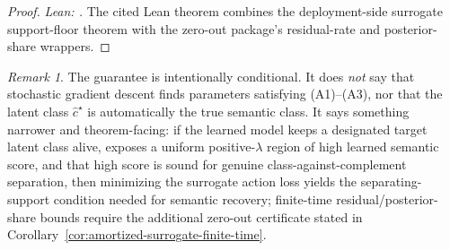 \documentclass[11pt]{article}
\theoremstyle{definition}
\theoremstyle{remark}
\newtheorem{remark}[theorem]{Remark}
\theoremstyle{plain}
\theoremstyle{definition}
\begin{document}
\begin{proof}
\noindent\emph{Lean: .}
The cited Lean theorem combines the deployment-side surrogate support-floor theorem with the zero-out package's residual-rate and posterior-share wrappers.
\end{proof}

\begin{remark}
\label{rem:amortized-surrogate-scope}
The guarantee is intentionally conditional. It does \emph{not} say that stochastic gradient descent finds parameters satisfying \textup{(A1)--(A3)}, nor that the latent class $\hat c^\star$ is automatically the true semantic class. It says something narrower and theorem-facing: if the learned model keeps a designated target latent class alive, exposes a uniform positive-$\lambda$ region of high learned semantic score, and that high score is sound for genuine class-against-complement separation, then minimizing the surrogate action loss yields the separating-support condition needed for semantic recovery; finite-time residual/posterior-share bounds require the additional zero-out certificate stated in Corollary~\ref{cor:amortized-surrogate-finite-time}.
\end{remark}
\end{document}
